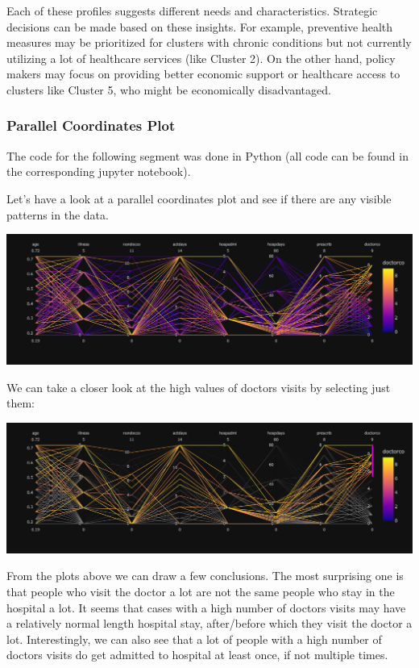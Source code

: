 \documentclass[
]{article}
\begin{document}
Each of these profiles suggests different needs and characteristics.
Strategic decisions can be made based on these insights. For example,
preventive health measures may be prioritized for clusters with chronic
conditions but not currently utilizing a lot of healthcare services
(like Cluster 2). On the other hand, policy makers may focus on
providing better economic support or healthcare access to clusters like
Cluster 5, who might be economically disadvantaged.

\subsubsection{Parallel Coordinates
Plot}\label{parallel-coordinates-plot}

The code for the following segment was done in Python (all code can be
found in the corresponding jupyter notebook).

Let's have a look at a parallel coordinates plot and see if there are
any visible patterns in the data.

\includegraphics{pc_plot1.png}

We can take a closer look at the high values of doctors visits by
selecting just them:

\includegraphics{pc_plot2.png}

From the plots above we can draw a few conclusions. The most surprising
one is that people who visit the doctor a lot are not the same people
who stay in the hospital a lot. It seems that cases with a high number
of doctors visits may have a relatively normal length hospital stay,
after/before which they visit the doctor a lot. Interestingly, we can
also see that a lot of people with a high number of doctors visits do
get admitted to hospital at least once, if not multiple times.
\end{document}
